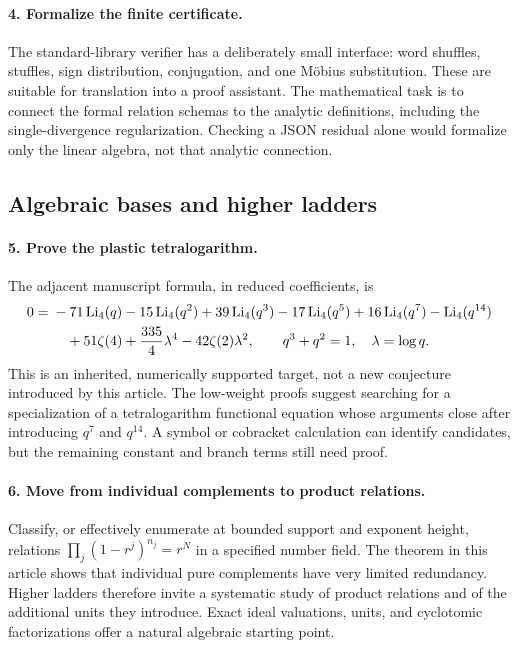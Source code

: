 \paragraph{4. Formalize the finite certificate.}
The standard-library verifier has a deliberately small interface:
word shuffles, stuffles, sign distribution, conjugation, and one
M\"obius substitution. These are suitable for translation into a proof
assistant. The mathematical task is to connect the formal relation
schemas to the analytic definitions, including the single-divergence
regularization. Checking a JSON residual alone would formalize only
the linear algebra, not that analytic connection.

\subsection{Algebraic bases and higher ladders}

\paragraph{5. Prove the plastic tetralogarithm.}
The adjacent manuscript formula, in reduced coefficients, is
\begin{align}
0={}&-71\operatorname{Li}_4(q)-15\operatorname{Li}_4(q^2)+39\operatorname{Li}_4(q^3)-17\operatorname{Li}_4(q^5)
       +16\operatorname{Li}_4(q^7)-\operatorname{Li}_4(q^{14})\notag\\
 &\quad+51\zeta(4)+\frac{335}{4}\lambda^4
                 -42\zeta(2)\lambda^2,
 \qquad q^3+q^2=1,\quad\lambda=\log q.
 \label{eq:open-plastic-four}
\end{align}
This is an inherited, numerically supported target, not a new
conjecture introduced by this article. The low-weight proofs suggest
searching for a specialization of a tetralogarithm functional equation
whose arguments close after introducing $q^7$ and $q^{14}$. A symbol or
cobracket calculation can identify candidates, but the remaining
constant and branch terms still need proof.

\paragraph{6. Move from individual complements to product relations.}
Classify, or effectively enumerate at bounded support and exponent
height, relations
$\prod_j(1-r^j)^{n_j}=r^N$ in a specified number field.
The theorem in this article shows that individual pure complements
have very limited redundancy. Higher ladders therefore invite a
systematic study of product relations and of the additional units
they introduce. Exact ideal valuations, units, and cyclotomic
factorizations offer a natural algebraic starting point.

